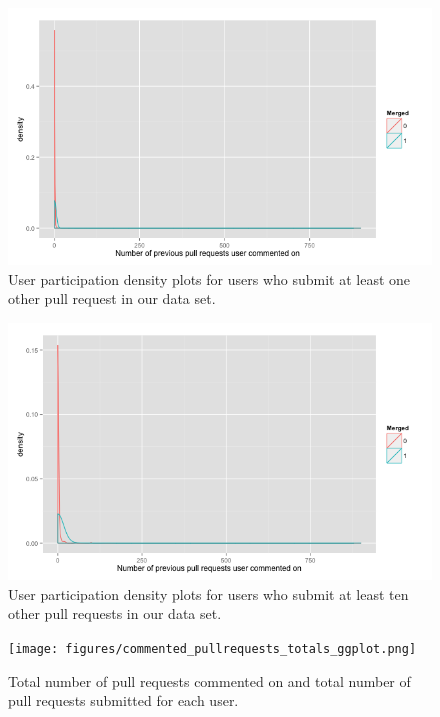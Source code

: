\documentclass{sigchi}
\begin{document}
\begin{figure}[p] \centering
\includegraphics[scale=0.6]{figures/number_comments_density_repeaters_ggplot.png}
\caption{User participation density plots for users who submit at least one
other pull request in our data set.} \label{fig:repeaters} \end{figure}

\begin{figure}[p] \centering
\includegraphics[scale=0.6]{figures/number_comments_density_repeaters_10_ggplot.png}
\caption{User participation density plots for users who submit at least ten
other pull requests in our data set.} \label{fig:repeaters_10} \end{figure}

\begin{figure}[p] \centering
\texttt{[image: figures/commented\_pullrequests\_totals\_ggplot.png]}
\caption{Total number of pull requests commented on and total number of pull
requests submitted for each user.} \label{fig:commented_pullrequests_totals}
\end{figure}
\end{document}
